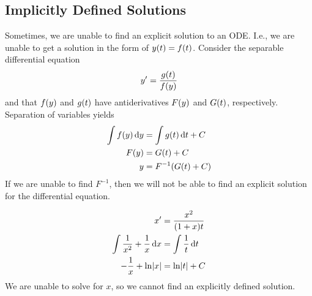 \subsection{Implicitly Defined Solutions}
Sometimes, we are unable to find an explicit solution to an ODE. I.e., we are unable to get a solution in the form of $y\p{t} = f\p{t}$. Consider the separable differential equation \[ y' = \frac{g\p{t}}{f\p{y}} \] and that $f\p{y}$ and $g\p{t}$ have antiderivatives $F\p{y}$ and $G\p{t}$, respectively. Separation of variables yields
\begin{align*}
	\int f\p{y} \, \diff{y} &= \int g\p{t} \, \diff{t} + C \\
	F\p{y} &= G\p{t} + C \\
	y &= F^{-1}\p{G\p{t} + C}
\end{align*}
If we are unable to find $F^{-1}$, then we will not be able to find an explicit solution for the differential equation.
\par\pagebreak
\begin{example}
	\noskip
	\begin{align*}
		x' &= \frac{x^2}{\p{1 + x}t} \\
		\int \frac{1}{x^2} + \frac{1}{x} \, \diff{x} &= \int \frac{1}{t} \, \diff{t} \\
		-\frac{1}{x} + \ln\abs{x} &= \ln\abs{t} + C
	\end{align*}
	We are unable to solve for $x$, so we cannot find an explicitly defined solution.
\end{example}